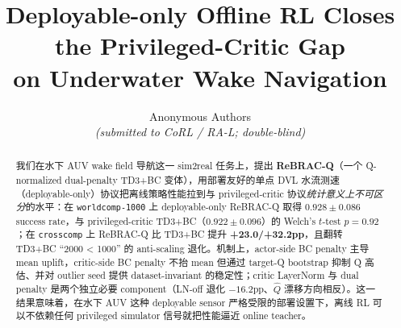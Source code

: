 \documentclass[11pt]{article}
\title{Deployable-only Offline RL Closes the Privileged-Critic Gap\\
on Underwater Wake Navigation}
\author{Anonymous Authors\\
\textit{(submitted to CoRL / RA-L; double-blind)}}
\date{}
\begin{document}
\maketitle

\begin{abstract}
我们在水下 AUV wake field 导航这一 sim2real 任务上，提出 \textbf{ReBRAC-Q}（一个 Q-normalized dual-penalty TD3+BC 变体），用部署友好的单点 DVL 水流测速（deployable-only）协议把离线策略性能拉到与 privileged-critic 协议\emph{统计意义上不可区分}的水平：在 \texttt{worldcomp-1000} 上 deployable-only ReBRAC-Q 取得 $0.928 \pm 0.086$ success rate，与 privileged-critic TD3+BC（$0.922 \pm 0.096$）的 Welch's $t$-test $p = 0.92$；在 \texttt{crosscomp} 上 ReBRAC-Q 比 TD3+BC 提升 \textbf{+23.0/+32.2pp}，且翻转 TD3+BC ``2000 < 1000'' 的 anti-scaling 退化。机制上，actor-side BC penalty 主导 mean uplift，critic-side BC penalty 不抬 mean 但通过 target-Q bootstrap 抑制 Q 高估、并对 outlier seed 提供 dataset-invariant 的稳定性；critic LayerNorm 与 dual penalty 是两个独立必要 component（LN-off 退化 $-16.2$pp、$\hat{Q}$ 漂移方向相反）。这一结果意味着，在水下 AUV 这种 deployable sensor 严格受限的部署设置下，离线 RL 可以不依赖任何 privileged simulator 信号就把性能逼近 online teacher。
\end{abstract}





\end{document}
